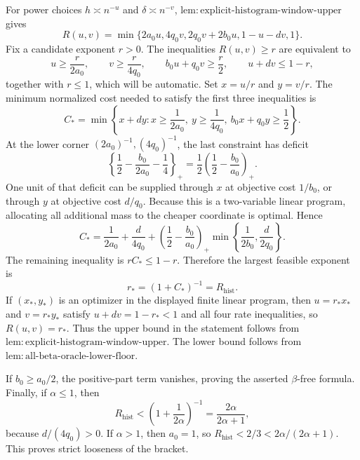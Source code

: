 For power choices \(h\asymp n^{-u}\) and \(\delta\asymp n^{-v}\), \(\mathrm{lem:explicit\text{-}histogram\text{-}window\text{-}upper}\) gives
\[
R(u,v)=\min\{2a_0u,4q_0v,2q_0v+2b_0u,1-u-dv,1\}.
\]
Fix a candidate exponent \(r>0\). The inequalities \(R(u,v)\ge r\) are equivalent to
\[
u\ge\frac{r}{2a_0},\qquad v\ge\frac{r}{4q_0},\qquad b_0u+q_0v\ge\frac r2,
\qquad u+dv\le1-r,
\]
together with \(r\le1\), which will be automatic. Set \(x=u/r\) and \(y=v/r\). The minimum normalized cost needed to satisfy the first three inequalities is
\[
C_*=\min\left\{x+dy:x\ge\frac{1}{2a_0},\ y\ge\frac{1}{4q_0},\ b_0x+q_0y\ge\frac12\right\}.
\]
At the lower corner \((2a_0)^{-1},(4q_0)^{-1}\), the last constraint has deficit
\[
\left\{\frac12-\frac{b_0}{2a_0}-\frac14\right\}_+
=\frac12\left(\frac12-\frac{b_0}{a_0}\right)_+.
\]
One unit of that deficit can be supplied through \(x\) at objective cost \(1/b_0\), or through \(y\) at objective cost \(d/q_0\). Because this is a two-variable linear program, allocating all additional mass to the cheaper coordinate is optimal. Hence
\[
C_*=\frac{1}{2a_0}+\frac{d}{4q_0}
+\left(\frac12-\frac{b_0}{a_0}\right)_+
\min\left\{\frac{1}{2b_0},\frac{d}{2q_0}\right\}.
\]
The remaining inequality is \(rC_*\le1-r\). Therefore the largest feasible exponent is
\[
r_*=(1+C_*)^{-1}=R_{\mathrm{hist}}.
\]
If \((x_*,y_*)\) is an optimizer in the displayed finite linear program, then \(u=r_*x_*\) and \(v=r_*y_*\) satisfy \(u+dv=1-r_*<1\) and all four rate inequalities, so \(R(u,v)=r_*\). Thus the upper bound in the statement follows from \(\mathrm{lem:explicit\text{-}histogram\text{-}window\text{-}upper}\). The lower bound follows from \(\mathrm{lem:all\text{-}beta\text{-}oracle\text{-}lower\text{-}floor}\).

If \(b_0\ge a_0/2\), the positive-part term vanishes, proving the asserted \(\beta\)-free formula. Finally, if \(\alpha\le1\), then
\[
R_{\mathrm{hist}}<\left(1+\frac{1}{2\alpha}\right)^{-1}=\frac{2\alpha}{2\alpha+1},
\]
because \(d/(4q_0)>0\). If \(\alpha>1\), then \(a_0=1\), so \(R_{\mathrm{hist}}<2/3<2\alpha/(2\alpha+1)\). This proves strict looseness of the bracket.